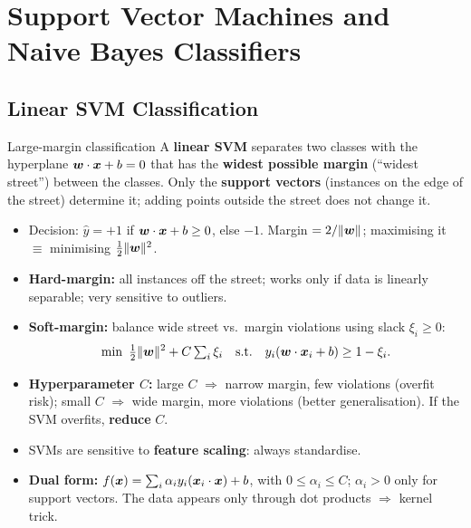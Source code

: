 \chapter{Support Vector Machines and Naive Bayes Classifiers}\label{n:svm}

\section{Linear SVM Classification}
\begin{dfn}{Large-margin classification}
A \textbf{linear SVM} separates two classes with the hyperplane $\boldsymbol{w}\cdot\boldsymbol{x}+b=0$ that has the \textbf{widest possible margin} (``widest street'') between the classes. Only the \textbf{support vectors} (instances on the edge of the street) determine it; adding points outside the street does not change it.
\end{dfn}
\begin{itemize}
  \item Decision: $\hat y=+1$ if $\boldsymbol{w}\cdot\boldsymbol{x}+b\ge0$, else $-1$. Margin $=2/\|\boldsymbol{w}\|$; maximising it $\equiv$ minimising $\frac12\|\boldsymbol{w}\|^2$.
  \item \textbf{Hard-margin:} all instances off the street; works only if data is linearly separable; very sensitive to outliers.
  \item \textbf{Soft-margin:} balance wide street vs.\ margin violations using slack $\xi_i\ge0$:
  \[\min\ \tfrac12\|\boldsymbol{w}\|^2+C\textstyle\sum_i\xi_i\quad\text{s.t.}\quad y_i(\boldsymbol{w}\cdot\boldsymbol{x}_i+b)\ge1-\xi_i.\]
  \item \textbf{Hyperparameter $C$:} large $C$ $\Rightarrow$ narrow margin, few violations (overfit risk); small $C$ $\Rightarrow$ wide margin, more violations (better generalisation). If the SVM overfits, \textbf{reduce} $C$.
  \item SVMs are sensitive to \textbf{feature scaling}: always standardise.
  \item \textbf{Dual form:} $f(\boldsymbol{x})=\sum_i\alpha_iy_i(\boldsymbol{x}_i\cdot\boldsymbol{x})+b$, with $0\le\alpha_i\le C$; $\alpha_i>0$ only for support vectors. The data appears only through dot products $\Rightarrow$ kernel trick.
\end{itemize}

